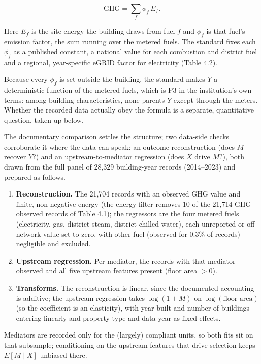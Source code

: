 \[
\mathrm{GHG} = \sum_{f} \phi_f\, E_f .
\]

Here $E_f$ is the site energy the building draws from fuel $f$ and $\phi_f$ is that fuel's emission factor, the sum running over the metered fuels. The standard fixes each $\phi_f$ as a published constant, a national value for each combustion and district fuel and a regional, year-specific eGRID factor for electricity (Table 4.2).

Because every $\phi_f$ is set outside the building, the standard makes $Y$ a deterministic function of the metered fuels, which is P3 in the institution's own terms: among building characteristics, none parents $Y$ except through the meters. Whether the recorded data actually obey the formula is a separate, quantitative question, taken up below.

The documentary comparison settles the structure; two data-side checks corroborate it where the data can speak: an outcome reconstruction (does $M$ recover $Y$?) and an upstream-to-mediator regression (does $X$ drive $M$?), both drawn from the full panel of 28,329 building-year records (2014--2023) and prepared as follows.

\begin{enumerate}
  \item \textbf{Reconstruction.} The 21,704 records with an observed GHG value and finite, non-negative energy (the energy filter removes 10 of the 21,714 GHG-observed records of Table 4.1); the regressors are the four metered fuels (electricity, gas, district steam, district chilled water), each unreported or off-network value set to zero, with other fuel (observed for 0.3\% of records) negligible and excluded.
  \item \textbf{Upstream regression.} Per mediator, the records with that mediator observed and all five upstream features present (floor area $> 0$).
  \item \textbf{Transforms.} The reconstruction is linear, since the documented accounting is additive; the upstream regression takes $\log(1+M)$ on $\log(\text{floor area})$ (so the coefficient is an elasticity), with year built and number of buildings entering linearly and property type and data year as fixed effects.
\end{enumerate}

Mediators are recorded only for the (largely) compliant units, so both fits sit on that subsample; conditioning on the upstream features that drive selection keeps $E[M \mid X]$ unbiased there.

